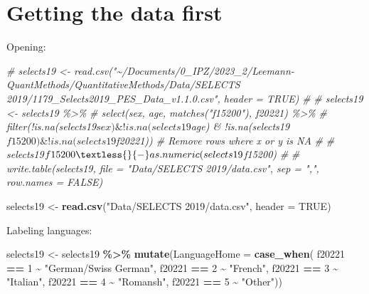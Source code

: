\documentclass[
]{book}
\newenvironment{Shaded}{\begin{snugshade}}{\end{snugshade}}
\newcommand{\AttributeTok}[1]{\textcolor[rgb]{0.13,0.29,0.53}{#1}}
\newcommand{\CommentTok}[1]{\textcolor[rgb]{0.56,0.35,0.01}{\textit{#1}}}
\newcommand{\ConstantTok}[1]{\textcolor[rgb]{0.56,0.35,0.01}{#1}}
\newcommand{\DecValTok}[1]{\textcolor[rgb]{0.00,0.00,0.81}{#1}}
\newcommand{\FunctionTok}[1]{\textcolor[rgb]{0.13,0.29,0.53}{\textbf{#1}}}
\newcommand{\NormalTok}[1]{#1}
\newcommand{\OtherTok}[1]{\textcolor[rgb]{0.56,0.35,0.01}{#1}}
\newcommand{\SpecialCharTok}[1]{\textcolor[rgb]{0.81,0.36,0.00}{\textbf{#1}}}
\newcommand{\StringTok}[1]{\textcolor[rgb]{0.31,0.60,0.02}{#1}}
\begin{document}
\hypertarget{getting-the-data-first-1}{%
\section{Getting the data first}\label{getting-the-data-first-1}}

Opening:

\begin{Shaded}
\begin{Highlighting}[]
\CommentTok{\# selects19 \textless{}{-} read.csv("\textasciitilde{}/Documents/0\_IPZ/2023\_2/Leemann{-}QuantMethods/QuantitativeMethods/Data/SELECTS 2019/1179\_Selects2019\_PES\_Data\_v1.1.0.csv", header = TRUE)}
\CommentTok{\# }
\CommentTok{\# selects19 \textless{}{-} selects19 \%\textgreater{}\%}
\CommentTok{\#   select(sex, age, matches("f15200"), f20221) \%\textgreater{}\%}
\CommentTok{\#   filter(!is.na(selects19$sex) \& !is.na(selects19$age) \& !is.na(selects19$f15200) \& !is.na(selects19$f20221))  \# Remove rows where x or y is NA}
\CommentTok{\# }
\CommentTok{\# selects19$f15200 \textless{}{-} as.numeric(selects19$f15200)}
\CommentTok{\# }
\CommentTok{\# write.table(selects19, file = "Data/SELECTS 2019/data.csv", sep = ",", row.names = FALSE)}

\NormalTok{selects19 }\OtherTok{\textless{}{-}} \FunctionTok{read.csv}\NormalTok{(}\StringTok{"Data/SELECTS 2019/data.csv"}\NormalTok{, }\AttributeTok{header =} \ConstantTok{TRUE}\NormalTok{)}
\end{Highlighting}
\end{Shaded}

Labeling languages:

\begin{Shaded}
\begin{Highlighting}[]
\NormalTok{selects19 }\OtherTok{\textless{}{-}}\NormalTok{ selects19 }\SpecialCharTok{\%\textgreater{}\%}
  \FunctionTok{mutate}\NormalTok{(}\AttributeTok{LanguageHome =} \FunctionTok{case\_when}\NormalTok{(}
\NormalTok{    f20221 }\SpecialCharTok{==} \DecValTok{1} \SpecialCharTok{\textasciitilde{}} \StringTok{"German/Swiss German"}\NormalTok{,}
\NormalTok{    f20221 }\SpecialCharTok{==} \DecValTok{2} \SpecialCharTok{\textasciitilde{}} \StringTok{"French"}\NormalTok{,}
\NormalTok{    f20221 }\SpecialCharTok{==} \DecValTok{3} \SpecialCharTok{\textasciitilde{}} \StringTok{"Italian"}\NormalTok{,}
\NormalTok{    f20221 }\SpecialCharTok{==} \DecValTok{4} \SpecialCharTok{\textasciitilde{}} \StringTok{"Romansh"}\NormalTok{,}
\NormalTok{    f20221 }\SpecialCharTok{==} \DecValTok{5} \SpecialCharTok{\textasciitilde{}} \StringTok{"Other"}\NormalTok{))}
\end{Highlighting}
\end{Shaded}
\end{document}
